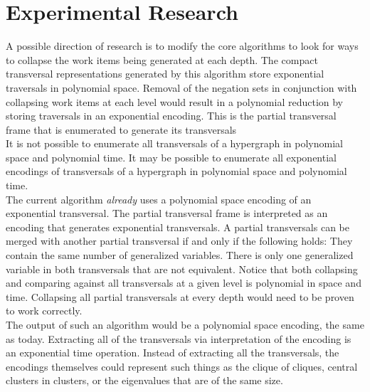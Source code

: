 \section{Experimental Research}
A possible direction of research is to modify the core algorithms to look for ways to collapse the work items being generated at each depth. The compact transversal representations generated by this algorithm store exponential traversals in polynomial space. Removal of the negation sets in conjunction with collapsing work items at each level would result in a polynomial reduction by storing traversals in an exponential encoding. This is the partial transversal frame that is enumerated to generate its transversals \\

It is not possible to enumerate all transversals of a hypergraph in polynomial space and polynomial time. It may be possible to enumerate all exponential encodings of transversals of a hypergraph in polynomial space and polynomial time. \\

The current algorithm \textit{already} uses a polynomial space encoding of an exponential transversal. The partial transversal frame is interpreted as an encoding that generates exponential transversals. A partial transversals can be merged with another partial transversal if and only if the following holds: They contain the same number of generalized variables. There is only one generalized variable in both transversals that are not equivalent. Notice that both collapsing and comparing against all transversals at a given level is polynomial in space and time. Collapsing all partial transversals at every depth would need to be proven to work correctly.\\

The output of such an algorithm would be a polynomial space encoding, the same as today. Extracting all of the transversals via interpretation of the encoding is an exponential time operation. Instead of extracting all the transversals, the encodings themselves could represent such things as the clique of cliques, central clusters in clusters, or the eigenvalues that are of the same size.\\


